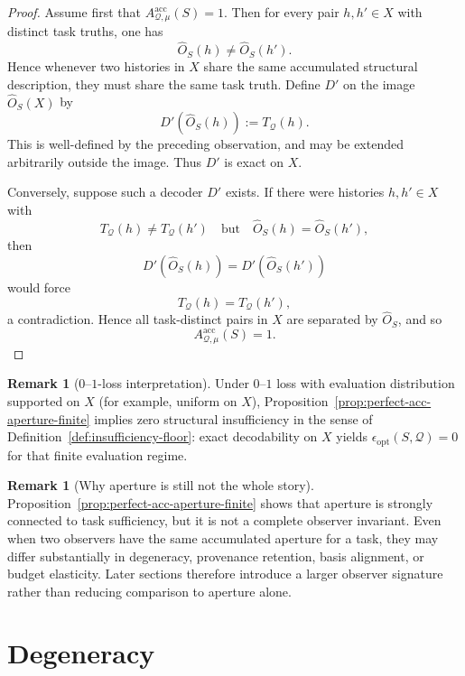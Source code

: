 \documentclass[11pt,twoside]{article}
\theoremstyle{definition}
\newtheorem{remark}[theorem]{Remark}
\newcommand{\acc}{\mathrm{acc}}
\begin{document}
\begin{proof}
Assume first that \(A^{\acc}_{\mathcal{Q},\mu}(S)=1\). Then for every pair \(h,h'\in X\) with distinct task truths, one has
\[
  \widehat{O}_S(h)\neq \widehat{O}_S(h').
\]
Hence whenever two histories in \(X\) share the same accumulated structural description, they must share the same task truth. Define \(D'\) on the image \(\widehat{O}_S(X)\) by
\[
  D'(\widehat{O}_S(h)) := T_{\mathcal{Q}}(h).
\]
This is well-defined by the preceding observation, and may be extended arbitrarily outside the image. Thus \(D'\) is exact on \(X\).

Conversely, suppose such a decoder \(D'\) exists. If there were histories \(h,h'\in X\) with
\[
  T_{\mathcal{Q}}(h)\neq T_{\mathcal{Q}}(h')
  \quad\text{but}\quad
  \widehat{O}_S(h)=\widehat{O}_S(h'),
\]
then
\[
  D'(\widehat{O}_S(h))
  =
  D'(\widehat{O}_S(h'))
\]
would force
\[
  T_{\mathcal{Q}}(h)=T_{\mathcal{Q}}(h'),
\]
a contradiction. Hence all task-distinct pairs in \(X\) are separated by \(\widehat{O}_S\), and so
\[
  A^{\acc}_{\mathcal{Q},\mu}(S)=1.
\]
\end{proof}

\begin{remark}[\(0\)--\(1\)-loss interpretation]
\label{rem:perfect-acc-aperture-zero-insuff}
Under \(0\)--\(1\) loss with evaluation distribution supported on \(X\) (for example, uniform on \(X\)), Proposition~\ref{prop:perfect-acc-aperture-finite} implies zero structural insufficiency in the sense of Definition~\ref{def:insufficiency-floor}: exact decodability on \(X\) yields \(\epsilon_{\mathrm{opt}}(S,\mathcal{Q})=0\) for that finite evaluation regime.
\end{remark}

\begin{remark}[Why aperture is still not the whole story]
\label{rem:aperture-not-whole-story}
Proposition~\ref{prop:perfect-acc-aperture-finite} shows that aperture is strongly connected to task sufficiency, but it is not a complete observer invariant. Even when two observers have the same accumulated aperture for a task, they may differ substantially in degeneracy, provenance retention, basis alignment, or budget elasticity. Later sections therefore introduce a larger observer signature rather than reducing comparison to aperture alone.
\end{remark}

\section{Degeneracy}
\label{sec:degeneracy}
\end{document}
